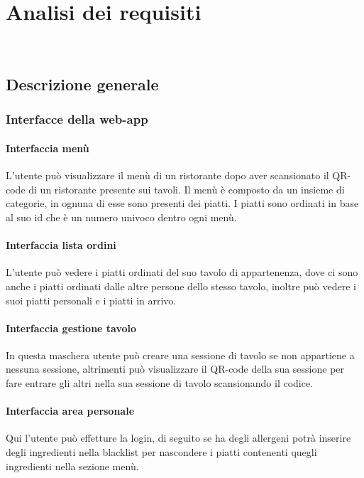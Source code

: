 
\chapter{Analisi dei requisiti}
\label{cap:analisi dei requisiti}

\\

\section{Descrizione generale}
\subsection{Interfacce della web-app}
\subsubsection{Interfaccia menù}
L'utente può visualizzare il menù di un ristorante dopo aver scansionato il QR-code di un ristorante presente sui tavoli. Il menù è composto da un insieme di categorie, in ognuna di esse sono presenti dei piatti. I piatti sono ordinati in base al suo id che è un numero univoco dentro ogni menù.
\subsubsection{Interfaccia lista ordini}
L'utente può vedere i piatti ordinati del suo tavolo di appartenenza, dove ci sono anche i piatti ordinati dalle altre persone dello stesso tavolo, inoltre può vedere i suoi piatti personali e i piatti in arrivo.
\subsubsection{Interfaccia gestione tavolo}
In questa maschera utente può creare una sessione di tavolo se non appartiene a nessuna sessione, altrimenti può visualizzare il QR-code della sua sessione per fare entrare gli altri nella sua sessione di tavolo scansionando il codice.
\subsubsection{Interfaccia area personale}
Qui l'utente può effetture la login, di seguito se ha degli allergeni potrà inserire degli ingredienti nella blacklist per nascondere i piatti contenenti quegli ingredienti nella sezione menù.
